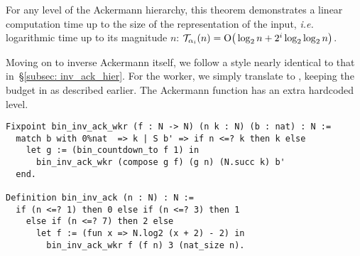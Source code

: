 \noindent For any level of the Ackermann hierarchy, this theorem demonstrates
a linear computation time up to the size of the representation of the input, \emph{i.e.} logarithmic time up to its magnitude $n$:
$\mathcal{T}_{\alpha_i}(n) = \text{O}\big(\log_2n + 2^i\log_2\log_2n \big)$.

Moving on to inverse Ackermann itself, we follow a style nearly identical to that 
in~\S\ref{subsec: inv_ack_hier}. For the worker, we simply translate to 
, keeping the budget in  as described earlier. 
The Ackermann function has an extra hardcoded level.
\begin{lstlisting}
Fixpoint bin_inv_ack_wkr (f : N -> N) (n k : N) (b : nat) : N :=
  match b with 0%nat  => k | S b' => if n <=? k then k else
    let g := (bin_countdown_to f 1) in 
      bin_inv_ack_wkr (compose g f) (g n) (N.succ k) b'
  end.

Definition bin_inv_ack (n : N) : N :=
  if (n <=? 1) then 0 else if (n <=? 3) then 1
    else if (n <=? 7) then 2 else
      let f := (fun x => N.log2 (x + 2) - 2) in 
        bin_inv_ack_wkr f (f n) 3 (nat_size n).
\end{lstlisting}

